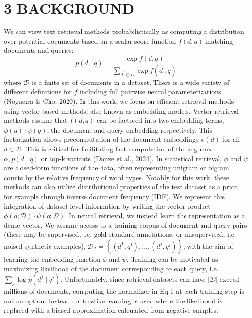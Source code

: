 \section*{3 BACKGROUND}
We can view text retrieval methods probabilistically as computing a distribution over potential documents based on a scalar score function \(f(d, q)\) matching documents and queries:
\[
p(d \mid q)=\frac{\exp f(d, q)}{\sum_{d^{\prime} \in D} \exp f\left(d^{\prime}, q\right)}
\]
where \(\mathcal{D}\) is a finite set of documents in a dataset. There is a wide variety of different definitions for \(f\) including full pairwise neural parameterizations (Nogueira \& Cho, 2020). In this work, we focus on efficient retrieval methods using vector-based methods, also known as embedding models.
Vector retrieval methods assume that \(f(d, q)\) can be factored into two embedding terms, \(\phi(d) \cdot \psi(q)\), the document and query embedding respectively. This factorization allows precomputation of the document embeddings \(\phi(d)\) for all \(d \in \mathcal{D}\). This is critical for facilitating fast computation of the arg max \(\alpha, p(d \mid q)\) or top-k variants (Douze et al., 2024).
In statistical retrieval, \(\phi\) and \(\psi\) are closed-form functions of the data, often representing unigram or bigram counts by the relative frequency of word types. Notably for this work, these methods can also utilize distributional properties of the test dataset as a prior, for example through inverse document frequency (IDF). We represent this integration of dataset-level information by writing the vector product \(\phi(d ; \mathcal{D}) \cdot \psi(q ; \mathcal{D})\).
In neural retrieval, we instead learn the representation as a dense vector. We assume access to a training corpus of document and query pairs (these may be supervised, i.e. gold-standard annotations, or unsupervised, i.e. noised synthetic examples), \(\mathcal{D}_{T}=\left\{\left(d^{1}, q^{1}\right), \ldots,\left(d^{j}, q^{j}\right)\right\}\), with the aim of learning the embedding function \(\phi\) and \(\psi\).
Training can be motivated as maximizing likelihood of the document corresponding to each query, i.e. \(\sum_{j} \log p\left(d^{j} \mid q^{j}\right)\). Unfortunately, since retrieval datasets can have \(|\mathcal{D}|\) exceed millions of documents, computing the normalizer in Eq 1 at each training step is not an option. Instead contrastive learning is used where the likelihood is replaced with a biased approximation calculated from negative samples:

